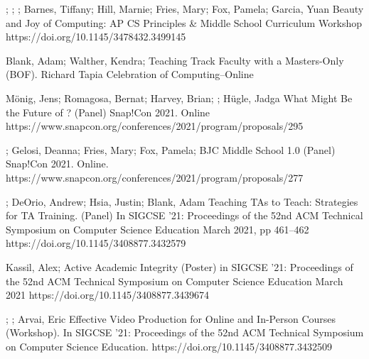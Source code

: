 \begin{etaremune}
    \sigcsePVD
        {\me; \lauren; \dan; Barnes, Tiffany; Hill, Marnie; Fries, Mary; Fox, Pamela; Garcia, Yuan}
        {Beauty and Joy of Computing: AP CS Principles \& Middle School Curriculum}
        {Workshop}
        {https://doi.org/10.1145/3478432.3499145}
    
    \item{Blank, Adam; Walther, Kendra; \me \newline Teaching Track Faculty with a Masters-Only (BOF).
     Richard Tapia Celebration of Computing–Online
    }
    
    \item{Mönig, Jens; Romagosa, Bernat; Harvey, Brian; \me; Hügle, Jadga
    \newline
    What Might Be the Future of \snap? (Panel) Snap!Con 2021. Online
    \newline
    https://www.snapcon.org/conferences/2021/program/proposals/295}
    
    \item{\dan; Gelosi, Deanna; Fries, Mary; Fox, Pamela; \me
    \newline BJC Middle School 1.0 (Panel)
    Snap!Con 2021. Online.
    \newline
    https://www.snapcon.org/conferences/2021/program/proposals/277}

    \item{\me; DeOrio, Andrew; Hsia, Justin; Blank, Adam
    \newline Teaching TAs to Teach: Strategies for TA Training. (Panel) \newline 
    In SIGCSE '21: Proceedings of the 52nd ACM Technical Symposium on Computer Science Education March 2021, pp 461–462
    \newline
    https://doi.org/10.1145/3408877.3432579}

    \item{Kassil, Alex; \me
    \newline Active Academic Integrity (Poster)
    \newline in SIGCSE '21: Proceedings of the 52nd ACM Technical Symposium on Computer Science Education March 2021 
    \newline
    https://doi.org/10.1145/3408877.3439674
    }

    \item{\me; \dan; Arvai, Eric
    \newline Effective Video Production for Online and In-Person Courses (Workshop).
    \newline In SIGCSE '21: Proceedings of the 52nd ACM Technical Symposium on Computer Science Education.
    \newline
    https://doi.org/10.1145/3408877.3432509}
    

\end{etaremune}
